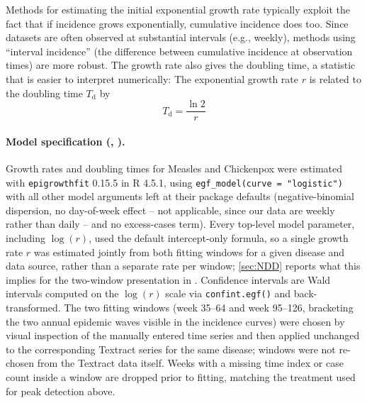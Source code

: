 \documentclass[12pt]{article}
\begin{document}
Methods for estimating the initial exponential growth rate \cite{Ma2014,JaganRpkg} typically exploit the fact that if incidence grows exponentially, cumulative incidence does too. Since datasets are often observed at substantial intervals (e.g., weekly), methods using ``interval incidence'' (the difference between cumulative incidence at observation times) are more robust. The growth rate also gives the doubling time, a statistic that is easier to interpret numerically:
The exponential growth rate \(r\) is related to the doubling time $T_{\mathrm{d}}$ by
\[
T_{\mathrm{d}} = \frac{\ln 2}{r}
\]

\paragraph{Model specification (, ).} Growth rates and doubling times for Measles and Chickenpox were estimated with \texttt{epigrowthfit} 0.15.5 \cite{JaganRpkg} in R 4.5.1, using \texttt{egf\_model(curve = "logistic")} with all other model arguments left at their package defaults (negative-binomial dispersion, no day-of-week effect -- not applicable, since our data are weekly rather than daily -- and no excess-cases term). Every top-level model parameter, including $\log(r)$, used the default intercept-only formula, so a single growth rate $r$ was estimated jointly from both fitting windows for a given disease and data source, rather than a separate rate per window; \cref{sec:NDD} reports what this implies for the two-window presentation in . Confidence intervals are Wald intervals computed on the $\log(r)$ scale via \texttt{confint.egf()} and back-transformed. The two fitting windows (week 35--64 and week 95--126, bracketing the two annual epidemic waves visible in the incidence curves) were chosen by visual inspection of the manually entered time series and then applied unchanged to the corresponding Textract series for the same disease; windows were not re-chosen from the Textract data itself. Weeks with a missing time index or case count inside a window are dropped prior to fitting, matching the treatment used for peak detection above.
\end{document}
